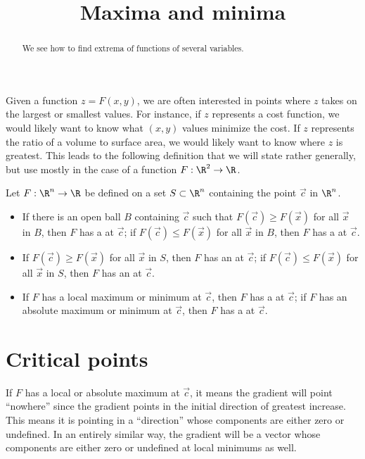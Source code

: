 \documentclass{ximera}
\title[Dig-In:]{Maxima and minima}
\begin{document}
\begin{abstract}
  We see how to find extrema of functions of several variables.
\end{abstract}
\maketitle


Given a function $z=F(x,y)$, we are often interested in points where
$z$ takes on the largest or smallest values. For instance, if $z$
represents a cost function, we would likely want to know what $(x,y)$
values minimize the cost. If $z$ represents the ratio of a volume to
surface area, we would likely want to know where $z$ is greatest. This
leads to the following definition that we will state rather generally,
but use mostly in the case of a function $F:\R^2\to\R$.

\begin{definition}
Let $F:\R^n\to\R$ be defined on a set $S\subset\R^n$ containing the
point $\vec{c}$ in $\R^n$.
\begin{itemize}
\item If there is an open ball $B$ containing $\vec{c}$ such that
  $F(\vec{c}) \geq F(\vec{x})$ for all $\vec{x}$ in $B$, then $F$ has a
   at $\vec{c}$; if $F(\vec{c}) \leq F(\vec{x})$ for all
  $\vec{x}$ in $B$, then $F$ has a  at $\vec{c}$.
\item If $F(\vec{c})\geq F(\vec{x})$ for all $\vec{x}$ in $S$, then $F$ has
  an  at $\vec{c}$; if $F(\vec{c})\leq F(\vec{x})$ for
  all $\vec{x}$ in $S$, then $F$ has an  at
  $\vec{c}$.
\item If $F$ has a local maximum or minimum at $\vec{c}$, then $F$ has a
   at $\vec{c}$; if $F$ has an absolute maximum or
  minimum at $\vec{c}$, then $F$ has a  at $\vec{c}$.
\end{itemize}
\end{definition}


\section{Critical points}



If $F$ has a local or absolute maximum at $\vec{c}$, it means the
gradient will point ``nowhere'' since the gradient points in the
initial direction of greatest increase. This means it is pointing in a
``direction'' whose components are either zero or undefined. In an
entirely similar way, the gradient will be a vector whose components
are either zero or undefined at local minimums as well. 
\end{document}
